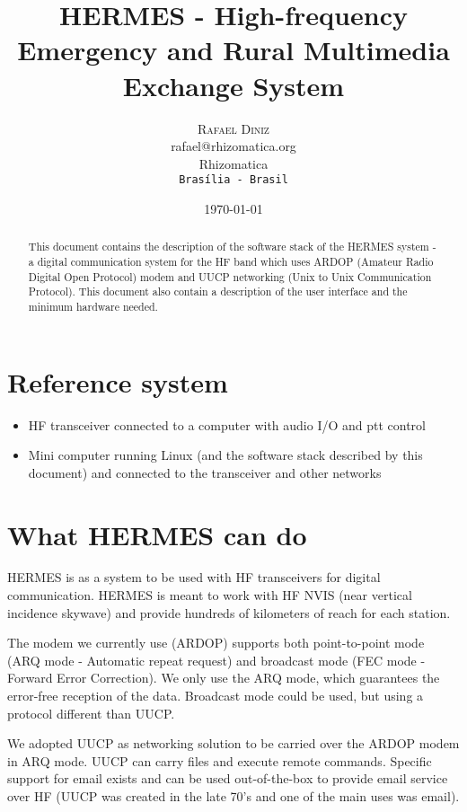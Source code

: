 \documentclass[11pt,a4paper]{article}
\title{HERMES - High-frequency Emergency and Rural Multimedia Exchange System}
\author{
       \large
        \textsc{Rafael Diniz}
        \mbox{}\\ %
        rafael@rhizomatica.org\\
        \mbox{Rhizomatica} \\ %
        \normalsize
        \texttt{Brasília - Brasil}\\
}
\date{\today}
\begin{document}
\maketitle

\begin{abstract}

This document contains the description of the software stack of the HERMES
system - a digital communication system for the HF band which uses ARDOP
(Amateur Radio Digital Open Protocol) modem and UUCP networking (Unix to Unix
Communication Protocol). This document also contain a description of the
user interface and the minimum hardware needed.

\end{abstract}

\newpage

\tableofcontents

\section{Reference system}

\begin{itemize}
\item HF transceiver connected to a computer with audio I/O and ptt control
\item Mini computer running Linux (and the software stack described by this
  document) and connected to the transceiver and other networks
\end{itemize}

\section{What HERMES can do}

HERMES is as a system to be used with HF transceivers for digital
communication. HERMES is meant to work with HF NVIS (near vertical incidence
skywave) and provide hundreds of kilometers of reach for each station.

The modem we currently use (ARDOP) supports both point-to-point mode (ARQ
mode - Automatic repeat request) and broadcast mode (FEC mode - Forward
Error Correction). We only use the ARQ mode, which guarantees the error-free
reception of the data. Broadcast mode could be used, but using a protocol
different than UUCP.

We adopted UUCP as networking solution to be carried over the ARDOP modem in
ARQ mode. UUCP can carry files and execute remote commands. Specific support
for email exists and can be used out-of-the-box to provide email service over
HF (UUCP was created in the late 70's and one of the main uses was email).
\end{document}
